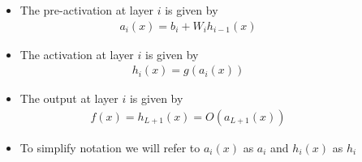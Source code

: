 \begin{frame}
  \begin{columns}
    \begin{overlayarea}{\textwidth}{\textheight}
      \makebox[\textwidth][c]{\usebox{\nncontent}}
    \end{overlayarea}

    \begin{overlayarea}{\textwidth}{\textheight}
      \begin{itemize}
        \item<1-> The pre-activation at layer $i$ is given by
          \begin{align*}
            a_i(x) = b_i + W_i h_{i-1}(x)
          \end{align*}
        \item<2-> The activation at layer $i$ is given by
          \begin{align*}
            h_i(x) = g(a_i(x))
          \end{align*}

        \item<4-> The output at layer $i$ is given by
            \begin{align*}
              f(x) = h_{L+1}(x) = O(a_{L+1}(x))
            \end{align*}
        \item<6-> To simplify notation we will refer to $a_i(x)$ as $a_i$ and $h_i(x)$ as $h_i$
      \end{itemize}
    \end{overlayarea}
  \end{columns}
\end{frame}

